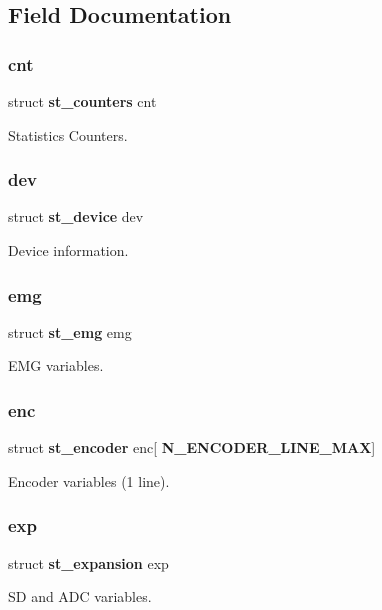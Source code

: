 \subsection{Field Documentation}
\mbox{\label{structst__eeprom_a0ffc8a85c87e768e5f0f4682ad738f47}} 
\subsubsection{cnt}
{\footnotesize\ttfamily struct \textbf{ st\+\_\+counters} cnt}

Statistics Counters. \mbox{\label{structst__eeprom_a0d9bfa887343b9469fc02391208359ff}} 
\subsubsection{dev}
{\footnotesize\ttfamily struct \textbf{ st\+\_\+device} dev}

Device information. \mbox{\label{structst__eeprom_a423333afbc7d0ab697d1f8e12ef8271f}} 
\subsubsection{emg}
{\footnotesize\ttfamily struct \textbf{ st\+\_\+emg} emg}

E\+MG variables. \mbox{\label{structst__eeprom_aa275bd5d24411d272636769852d7ccdc}} 
\subsubsection{enc}
{\footnotesize\ttfamily struct \textbf{ st\+\_\+encoder} enc[\textbf{ N\+\_\+\+E\+N\+C\+O\+D\+E\+R\+\_\+\+L\+I\+N\+E\+\_\+\+M\+AX}]}

Encoder variables (1 line). \mbox{\label{structst__eeprom_a928bf130fc931f6623a2ae15be1f7b18}} 
\subsubsection{exp}
{\footnotesize\ttfamily struct \textbf{ st\+\_\+expansion} exp}

SD and A\+DC variables. \mbox{\label{structst__eeprom_af11e40d15a1361229a78e772af5b3c94}} 
